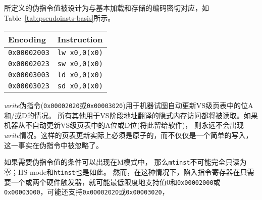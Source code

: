 所定义的伪指令值被设计为与基本加载和存储的编码密切对应，如Table~\ref{tab:pseudoinsts-basis}所示。

\begin{table*}[h!]
\begin{center}
\begin{tabular}{|l|l|}
\hline
Encoding         & Instruction \\ \hline
{\tt 0x00002003} & {\tt lw x0,0(x0)} \\
{\tt 0x00002023} & {\tt sw x0,0(x0)} \\ \hline
{\tt 0x00003003} & {\tt ld x0,0(x0)} \\
{\tt 0x00003023} & {\tt sd x0,0(x0)} \\ \hline
\end{tabular}
\end{center}
\caption{Standard instructions corresponding to the special
pseudoinstructions of Table~\ref{tab:pseudoinsts}.}
\label{tab:pseudoinsts-basis}
\end{table*}

\textit{write}伪指令({\tt 0x00002020}或{\tt 0x00003020})用于机器试图自动更新VS级页表中的位A和/或D的情况。
所有其他用于VS阶段地址翻译的隐式内存访问都将被读取。如果机器从不自动更新VS级页表中的A位或D位(将此留给软件)，
则永远不会出现\textit{write}情况。这样的页表更新实际上必须是原子的，而不仅仅是一个简单的写入，这一事实在伪指令中被忽略了。

\begin{commentary}
  如果需要伪指令值的条件可以出现在M模式中，
  那么{\tt mtinst}不可能完全只读为零；HS-mode和{\tt htinst}也是如此。
  然而，在这种情况下，陷入指令寄存器在只需要一个或两个硬件触发器，就可能最低限度地支持值0和{\tt 0x00002000}或{\tt 0x00003000}，可能还支持{\tt 0x00002020}或{\tt 0x00003020}，
\end{commentary}

